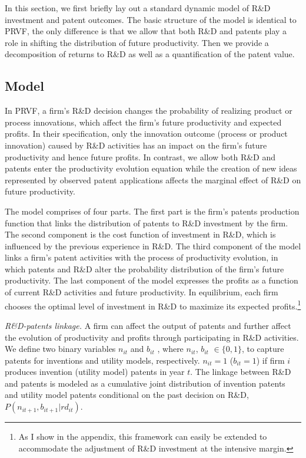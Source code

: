 \documentclass[11pt]{article}
\begin{document}
In this section, we first briefly lay out a standard dynamic model of R\&D investment and patent outcomes. The basic structure of the model is identical to PRVF, the only difference is that we allow that both R\&D and patents play a role in shifting the distribution of future productivity. Then we provide a decomposition of returns to R\&D as well as a quantification of the patent value. 

\subsection{Model}
In PRVF, a firm's R\&D decision changes the probability of realizing product or process innovations, which affect the firm’s future productivity and expected
profits. In their specification, only the innovation outcome (process or product innovation) caused by R\&D activities has an impact on the firm’s future productivity and hence future profits. In contrast, we allow both R\&D and patents enter the productivity evolution equation while the creation of new ideas represented by observed patent applications affects the marginal effect of R\&D on future productivity. 

The model comprises of four parts. The first part is the firm’s patents production function that links the distribution of patents to R\&D investment by the firm. The second component is the cost function of investment in R\&D, which is influenced by the previous experience in R\&D. The third component of the model links a firm’s patent activities with the process of productivity evolution, in which patents and R\&D alter the probability distribution of the firm’s future productivity. The last component of the model expresses the profits as a function of current R\&D activities and future productivity. In equilibrium, each firm chooses the optimal level of investment in R\&D to maximize its expected profits.\footnote{As I show in the appendix, this framework can easily be extended to accommodate the adjustment of R\&D investment at the intensive margin.}

\textit{R\&D-patents linkage.} A firm can affect the output of patents and further affect the evolution of
productivity and profits through participating in R\&D activities. We define two binary variables $n_{it}$ and $b_{it}$ , where $n_{it}$, $b_{it}$ $\in\{0,1\}$, to capture patents for inventions and utility models, respectively. $n_{it}=1$ ($b_{it}=1$) if firm $i$ produces invention (utility model) patents in year $t$. The linkage
between R\&D and patents is modeled as a cumulative joint distribution of invention patents and utility model patents conditional on the past decision on R\&D, $P(n_{it+1}, b_{it+1}|rd_{it})$.
\end{document}
